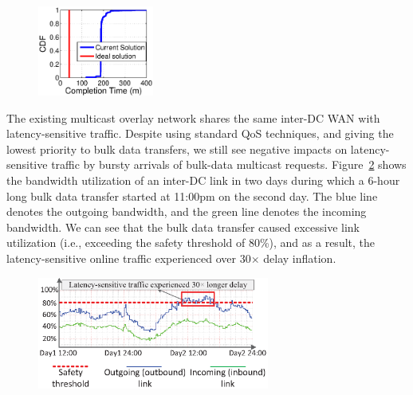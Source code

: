 \begin{figure}[t]
  \centering
  \includegraphics[width=1.5in]{images/SEvsIdeal.eps}
  \vspace{-0.2cm}
  \label{fig:motivation}
\vspace{-0.4cm}
\end{figure}

The existing multicast overlay network shares the same inter-DC WAN
with latency-sensitive traffic. Despite using standard QoS techniques,
and giving the lowest priority to bulk data transfers, we still see
negative impacts on latency-sensitive traffic by bursty arrivals of
bulk-data multicast requests. Figure~\ref{fig:lesson2} shows the
bandwidth utilization of an inter-DC link in two days during which a
6-hour long bulk data transfer started at 11:00pm on the second day.
The blue line denotes the outgoing bandwidth, and the green line
denotes the incoming bandwidth. We can see that the
bulk data transfer caused excessive link utilization (i.e., exceeding
the safety threshold of 80\%), and as a result, the latency-sensitive
online traffic experienced over 30$\times$ delay inflation.






\begin{figure}[t!]
        \center
        \includegraphics[width=3in]{images/nj02-M2A_0212-0216_v3.eps}
        \label{fig:lesson2}
\vspace{-0.4cm}
\end{figure}

